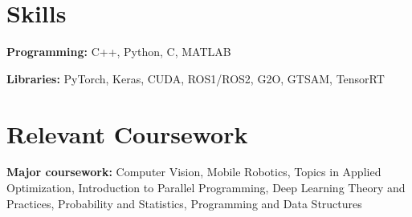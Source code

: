 \documentclass[letterpaper,11pt]{article}
\newcommand{\resumeSubHeadingListStart}{\begin{itemize}[leftmargin=0.15in, label={}]}
\newcommand{\resumeSubHeadingListEnd}{\end{itemize}}
\begin{document}
				
				



\section{Skills}
	\vspace{2pt}
	\resumeSubHeadingListStart
		\small{\item{
				\textbf{Programming:}{ C++, Python, C, MATLAB} \\ \vspace{3pt}
				
				\textbf{Libraries:}{ PyTorch, Keras, CUDA, ROS1/ROS2, G2O, GTSAM, TensorRT} \\ \vspace{3pt}
				
				
		}}
	\resumeSubHeadingListEnd




\section{Relevant Coursework}
	\vspace{2pt}
	\resumeSubHeadingListStart
		\small{\item{
				\textbf{Major coursework:}{ Computer Vision, Mobile Robotics, Topics in Applied Optimization, Introduction to Parallel Programming, Deep Learning Theory and Practices, Probability and Statistics, 
				Programming and Data Structures} \\ \vspace{3pt}
				
		}}
	\resumeSubHeadingListEnd
\end{document}
